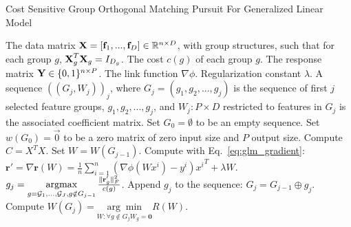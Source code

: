 \begin{algorithm}[tb]
\caption{Cost Sensitive Group Orthogonal Matching Pursuit For Generalized Linear Model}
 \label{algo:gomp_glm}
\begin{algorithmic}[1]
	 The data matrix $\textbf{X} = [ \textbf{f}_1, ..., \textbf{f}_D ] \in \mathbb{R}^{n \times D}$,
    with group structures, such that for each group $g$,
    $\textbf{X}^T_{g}\textbf{X}_{g} = I _{D_g}$.     
    The cost $c(g)$ of each group $g$. 
    The response matrix $\textbf{Y} \in \{0, 1\}^{n \times P}$.
    The link function $\nabla \phi$.
    Regularization constant $\lambda$.
	 A sequence $((G_j, W_j))_j$, where 
      $G_j = (g_1, g_2, ..., g_j)$ 
    is the sequence of first $j$ selected feature groups, $g_1, g_2, ..., g_j$, and 
      $W_j: P\times D$ restricted to features in $G_j$ 
      is the associated coefficient matrix.
    \STATE Set $G_0 = \emptyset$ to be an empty sequence.
    \STATE Set $w(G_0) = \vec{0}$ to be a zero matrix of zero input size and $P$ output size.
    \STATE Compute $C = X^TX$. 
 	\STATE Set $W = W(G_{j-1})$.
       \STATE Compute with Eq.~\ref{eq:glm_gradient}: 
       	$\textbf{r}' = \nabla \textbf{r}(W) = \frac{1}{n} \sum _{i=1}^n (\nabla \phi(Wx^i) - y^i){x^i}^T + \lambda W$.
    \ENDFOR
    \STATE $g_{j} = \operatorname*{argmax} \limits_{g = \mathcal{G}_1, ... , \mathcal{G}_J, g\notin G_{j-1}} 
    \frac{\Vert \textbf{r}'_g \Vert_F^2}{ c(g) }$.
   \STATE Append $g_j$ to the sequence: $G_{j} = G_{j-1} \oplus g_{j}$.
   \STATE Compute $W(G_j) = \underset{W : \forall g \notin G_j W_g = \textbf{0} }{\arg \min} R(W) $.
 \ENDFOR
\end{algorithmic}
\end{algorithm}